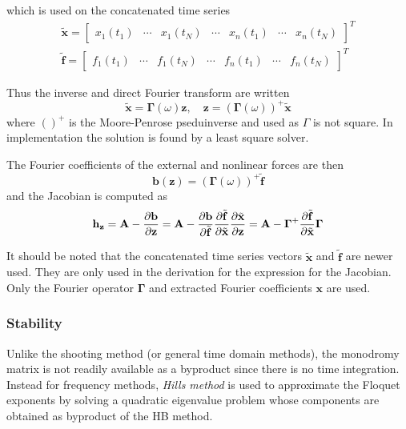 which is used on the concatenated time series
\begin{equation}
  \label{eq:hb_time_series}
  \begin{aligned}
    \tilde{\bm x} =
    \begin{bmatrix}
      x_1(t_1) & \cdots & x_1(t_N) & \cdots & x_n(t_1) & \cdots & x_n(t_N)
    \end{bmatrix}^T\\
    \tilde{\bm f} =
    \begin{bmatrix}
      f_1(t_1) & \cdots & f_1(t_N) & \cdots & f_n(t_1) & \cdots & f_n(t_N)
    \end{bmatrix}^T
  \end{aligned}
\end{equation}

Thus the inverse and direct Fourier transform are written
\begin{equation}
  \label{eq:hb_four_transform}
    \tilde{\bm x} = \bm \Gamma(\omega) \bm z, \quad
    \bm z =( \bm \Gamma(\omega))^+ \tilde{\bm x}
\end{equation}
where $()^+$ is the Moore-Penrose pseduinverse and used as $\Gamma$ is not
square. In implementation the solution is found by a least square solver.

The Fourier coefficients of the external and nonlinear forces are then
\begin{equation}
  \label{eq:hb_b_coeff}
  \bm b(\bm z) = ( \bm \Gamma(\omega))^+ \tilde{\bm f}
\end{equation}
and the Jacobian is computed as
\begin{equation}
  \label{eq:hb_jac}
  \bm h_{\bm z} = \bm A - \frac{\p \bm b}{\p \bm z} =
  \bm A -
  \frac{\p\bm b}{\p \tilde{\bm f}}
  \frac{\p \tilde{\bm f}}{\p \tilde{\bm x}}
  \frac{\p \tilde{\bm x}}{\p \bm z} =
  \bm A - \bm \Gamma^+ \frac{\p \tilde{\bm f}}{\p \tilde{\bm x}} \bm \Gamma
\end{equation}

It should be noted that the concatenated time series vectors $\tilde{\bm x}$ and
$\tilde{\bm f}$ are newer used. They are only used in the derivation for the
expression for the Jacobian. Only the Fourier operator $\bm \Gamma$ and
extracted Fourier coefficients $\bm x$ are used.


\subsubsection{Stability}
\label{sec:hb_stab}

Unlike the shooting method (or general time domain methods), the monodromy
matrix is not readily available as a byproduct since there is no time
integration. Instead for frequency methods, \textit{Hills method} is used to
approximate the Floquet exponents by solving a quadratic eigenvalue problem
whose components are obtained as byproduct of the HB method.

